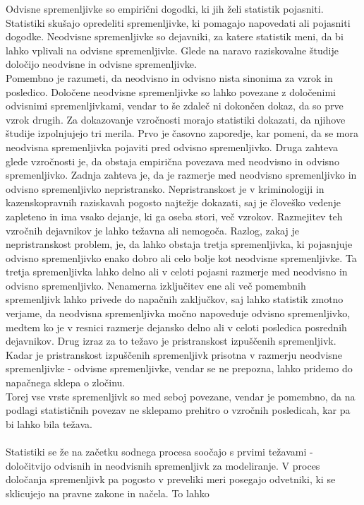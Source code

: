 \documentclass[fin1, tisk]{fmfdelo}
\theoremstyle{definition}
\theoremstyle{trditev}
\theoremstyle{izrek}
\begin{document}
Odvisne spremenljivke so empirični dogodki, ki jih želi statistik pojasniti. Statistiki skušajo opredeliti spremenljivke, ki pomagajo
napovedati ali pojasniti dogodke. Neodvisne spremenljivke so dejavniki, za katere statistik meni, da bi lahko vplivali na odvisne
spremenljivke. Glede na naravo raziskovalne študije določijo neodvisne in odvisne spremenljivke.\\
Pomembno je razumeti, da neodvisno in odvisno nista sinonima za vzrok in posledico. Določene neodvisne spremenljivke so lahko povezane z
določenimi odvisnimi spremenljivkami, vendar to še zdaleč ni dokončen dokaz, da so prve vzrok drugih. Za dokazovanje vzročnosti morajo
statistiki dokazati, da njihove študije izpolnjujejo tri merila. Prvo je časovno zaporedje, kar pomeni, da se mora neodvisna spremenljivka
pojaviti pred odvisno spremenljivko. Druga zahteva glede vzročnosti je, da obstaja empirična povezava med neodvisno in odvisno spremenljivko.
Zadnja zahteva je, da je razmerje med neodvisno spremenljivko in odvisno spremenljivko nepristransko. Nepristranskost je v kriminologiji in
kazenskopravnih raziskavah pogosto najtežje dokazati, saj je človeško vedenje zapleteno in ima vsako dejanje, ki ga oseba stori, več vzrokov.
Razmejitev teh vzročnih dejavnikov je lahko težavna ali nemogoča. Razlog, zakaj je nepristranskost problem, je, da lahko obstaja tretja
spremenljivka, ki pojasnjuje odvisno spremenljivko enako dobro ali celo bolje kot neodvisne spremenljivke. Ta tretja spremenljivka lahko delno
ali v celoti pojasni razmerje med neodvisno in odvisno spremenljivko. Nenamerna izključitev ene ali več pomembnih spremenljivk lahko privede do
napačnih zaključkov, saj lahko statistik zmotno verjame, da neodvisna spremenljivka močno napoveduje odvisno spremenljivko, medtem ko je v
resnici razmerje dejansko delno ali v celoti posledica posrednih dejavnikov. Drug izraz za to težavo je pristranskost izpuščenih spremenljivk.
Kadar je pristranskost izpuščenih spremenljivk prisotna v razmerju neodvisne spremenljivke - odvisne spremenljivke, vendar se ne prepozna, lahko
pridemo do napačnega sklepa o zločinu.\\
Torej vse vrste spremenljivk so med seboj povezane, vendar je pomembno, da na podlagi statističnih povezav ne sklepamo prehitro o vzročnih posledicah,
kar pa bi lahko bila težava.\\\\
Statistiki se že na začetku sodnega procesa soočajo s prvimi težavami - določitvijo odvisnih in neodvisnih spremenljivk za
modeliranje. V proces določanja spremenljivk pa pogosto v preveliki meri posegajo odvetniki, ki se sklicujejo na pravne zakone in načela. To lahko
\end{document}
